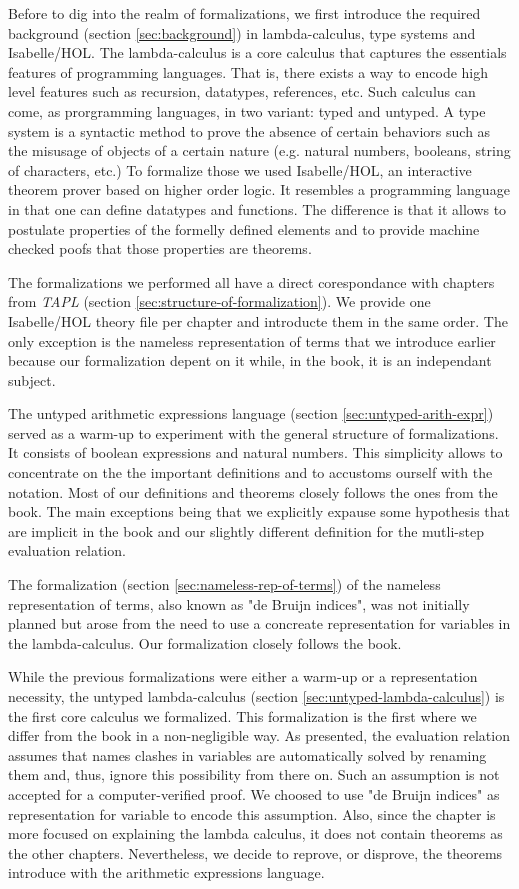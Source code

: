 \documentclass[a4paper, oneside, 12pt, titlepage]{article}
\begin{document}
Before to dig into the realm of formalizations, we first introduce the required background (section
\ref{sec:background}) in lambda-calculus, type systems and Isabelle/HOL. The lambda-calculus is a
core calculus that captures the essentials features of programming languages. That is, there exists
a way to encode high level features such as recursion, datatypes, references, etc. Such calculus can
come, as prorgramming languages, in two variant: typed and untyped. A type system is a syntactic
method to prove the absence of certain behaviors such as the misusage of objects of a certain nature
(e.g. natural numbers, booleans, string of characters, etc.) To formalize those we used
Isabelle/HOL, an interactive theorem prover based on higher order logic. It resembles a programming
language in that one can define datatypes and functions. The difference is that it allows to
postulate properties of the formelly defined elements and to provide machine checked poofs that
those properties are theorems.

The formalizations we performed all have a direct corespondance with chapters from \emph{TAPL}
(section \ref{sec:structure-of-formalization}). We provide one Isabelle/HOL theory file per chapter
and introducte them in the same order. The only exception is the nameless representation of terms
that we introduce earlier because our formalization depent on it while, in the book, it is an
independant subject.

The untyped arithmetic expressions language (section \ref{sec:untyped-arith-expr}) served as a
warm-up to experiment with the general structure of formalizations. It consists of boolean
expressions and natural numbers. This simplicity allows to concentrate on the the important
definitions and to accustoms ourself with the notation. Most of our definitions and theorems closely
follows the ones from the book. The main exceptions being that we explicitly expause some hypothesis
that are implicit in the book and our slightly different definition for the mutli-step evaluation
relation.

The formalization (section \ref{sec:nameless-rep-of-terms}) of the nameless representation of terms,
also known as "de Bruijn indices", was not initially planned but arose from the need to use a
concreate representation for variables in the lambda-calculus. Our formalization closely follows the
book.

While the previous formalizations were either a warm-up or a representation necessity, the untyped
lambda-calculus (section \ref{sec:untyped-lambda-calculus}) is the first core calculus we
formalized. This formalization is the first where we differ from the book in a non-negligible way.
As presented, the evaluation relation assumes that names clashes in variables are automatically
solved by renaming them and, thus, ignore this possibility from there on. Such an assumption is not
accepted for a computer-verified proof. We choosed to use "de Bruijn indices" as representation for
variable to encode this assumption. Also, since the chapter is more focused on explaining the lambda
calculus, it does not contain theorems as the other chapters. Nevertheless, we decide to reprove, or
disprove, the theorems introduce with the arithmetic expressions language.
\end{document}
